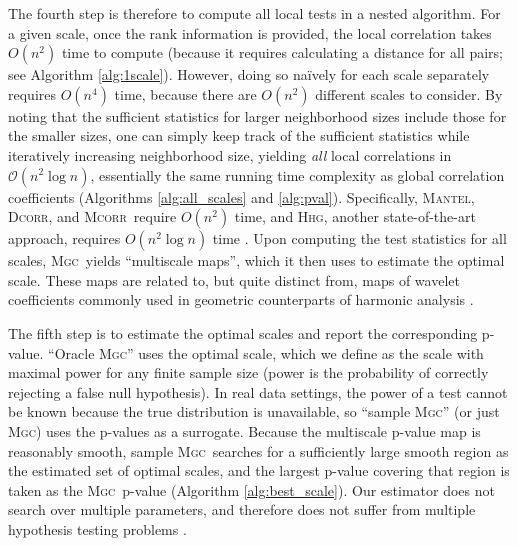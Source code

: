 \documentclass[11pt]{article}
\providecommand{\sct}[1]{{\normalfont\textsc{#1}}}
\providecommand{\mc}[1]{\mathcal{#1}}
\newcommand{\Mgc}{\sct{Mgc}}
\newcommand{\Hhg}{\sct{Hhg}}
\newcommand{\Dcorr}{\sct{Dcorr}}
\newcommand{\Mcorr}{\sct{Mcorr}}
\newcommand{\Mantel}{\sct{Mantel}}
\begin{document}


The fourth step is therefore to compute all local tests in a nested algorithm.
For a given scale, once the rank information is provided, the local correlation takes $O(n^2)$ time to compute (because it requires calculating a distance for all pairs; see Algorithm \ref{alg:1scale}). 
% 
However, doing so na\"ively for each scale separately requires $O(n^4)$ time, because there are $O(n^2)$ different scales to consider. 
% 
By noting that the sufficient statistics for larger neighborhood sizes include those for the smaller sizes, one can simply keep track of the sufficient statistics while iteratively increasing neighborhood size, yielding  \emph{all} local correlations in $\mc{O}(n^2 \log n)$, essentially the same running time complexity as  global correlation coefficients (Algorithms \ref{alg:all_scales} and \ref{alg:pval}). Specifically, \Mantel, \Dcorr, and \Mcorr~require $O(n^2)$ time, and \Hhg, another state-of-the-art approach,  requires $O(n^2 \log n)$ time \cite{HellerGorfine2013}.  Upon computing the test statistics for all scales, \Mgc~yields ``multiscale maps'', which it then uses to estimate the optimal scale. These maps are  related to, but quite distinct from, maps of wavelet coefficients commonly used in geometric counterparts of harmonic analysis \cite{Allard2012,MMS:NoisyDictionaryLearning}.


The fifth step is to estimate the optimal scales and report the corresponding p-value.  ``Oracle \Mgc'' uses the optimal scale, which we define as the scale with maximal power for any finite sample size (power is the probability of correctly rejecting a false null hypothesis). In real data settings, the power of a test cannot be known because the true distribution is unavailable, so  ``sample \Mgc'' (or just \Mgc) uses the p-values as a surrogate. 
Because the multiscale p-value map is reasonably smooth, sample \Mgc~searches for a sufficiently large smooth region as the estimated set of optimal scales, and the largest p-value covering that region is taken as the \Mgc~p-value (Algorithm \ref{alg:best_scale}).
Our estimator does not search over multiple parameters, and therefore does not suffer from multiple hypothesis testing problems \cite{Benjamini1995}.
\end{document}
